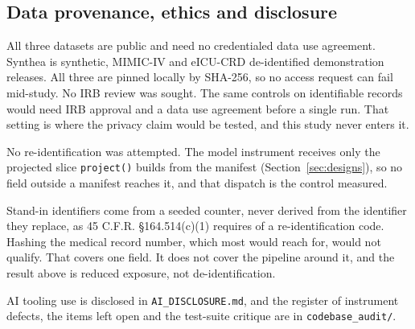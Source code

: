 \subsection{Data provenance, ethics and disclosure}
\label{sec:ethics}

All three datasets are public and need no credentialed data use agreement. Synthea is synthetic,
MIMIC-IV and eICU-CRD de-identified demonstration releases. All three are pinned locally by SHA-256,
so no access request can fail mid-study. No IRB review was sought. The same controls on identifiable
records would need IRB approval and a data use agreement before a single run. That setting is where
the privacy claim would be tested, and this study never enters it.

No re-identification was attempted. The model instrument receives only the projected slice
\texttt{project()} builds from the manifest (Section~\ref{sec:designs}), so no field outside a
manifest reaches it, and that dispatch is the control measured.

Stand-in identifiers come from a seeded counter, never derived from the identifier they replace,
as 45 C.F.R. \S 164.514(c)(1) requires of a re-identification code. Hashing the medical record
number, which most would reach for, would not qualify. That covers one field. It does not cover
the pipeline around it, and the result above is reduced exposure, not de-identification.

AI tooling use is disclosed in \texttt{AI\_DISCLOSURE.md}, and the register of instrument defects,
the items left open and the test-suite critique are in \texttt{codebase\_audit/}.
